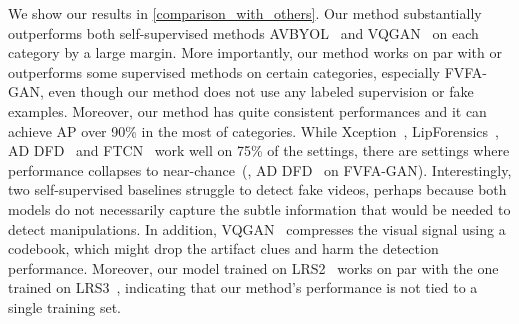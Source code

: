 \documentclass[10pt,twocolumn,letterpaper]{article}
\begin{document}
We show our results in \cref{comparison_with_others}. Our method substantially outperforms both self-supervised methods AVBYOL~\cite{haliassos2022leveraging, grill2020bootstrap} and VQGAN~\cite{esser2021taming} on each category by a large margin. More importantly, our method works on par with or outperforms some supervised methods on certain categories, especially FVFA-GAN, even though our method does not use any labeled supervision or fake examples.  Moreover, our method has quite consistent performances and it can achieve AP over 90\% in the most of categories. While Xception~\cite{rossler2019faceforensics++}, LipForensics~\cite{haliassos2021lips}, AD DFD~\cite{zhou2021joint} and  FTCN~\cite{zheng2021exploring} work well on 75\% of the settings, there are settings where performance collapses to near-chance~(\eg, AD DFD~\cite{zhou2021joint} on FVFA-GAN). Interestingly, two self-supervised baselines struggle to detect fake videos, perhaps because both models do not necessarily capture the subtle information that would be needed to detect manipulations. In addition, 
VQGAN~\cite{esser2021taming} compresses the visual signal using a codebook, which might drop the artifact clues and harm the detection performance. Moreover, our model trained on LRS2~\cite{Afouras18c} works on par with the one trained on LRS3~\cite{afouras2018lrs3}, indicating that our method's performance is not tied to a single training set.
\end{document}
